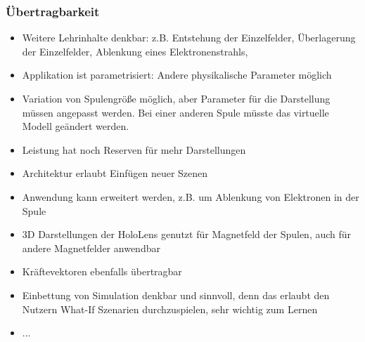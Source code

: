 \subsubsection{Übertragbarkeit}
\begin{itemize}
	\item Weitere Lehrinhalte denkbar: z.B. Entstehung der Einzelfelder, Überlagerung der Einzelfelder, Ablenkung eines Elektronenstrahls, 
	\item Applikation ist parametrisiert: Andere physikalische Parameter möglich
	\item Variation von Spulengröße möglich, aber Parameter für die Darstellung müssen angepasst werden. Bei einer anderen Spule müsste das virtuelle Modell geändert werden.
	\item Leistung hat noch Reserven für mehr Darstellungen
	\item Architektur erlaubt Einfügen neuer Szenen
\end{itemize}
\begin{itemize}
	\item Anwendung kann erweitert werden, z.B. um Ablenkung von Elektronen in der Spule
	\item 3D Darstellungen der HoloLens genutzt für Magnetfeld der Spulen, auch für andere Magnetfelder anwendbar
	\item Kräftevektoren ebenfalls übertragbar
	\item Einbettung von Simulation denkbar und sinnvoll, denn das erlaubt den Nutzern What-If Szenarien durchzuspielen, sehr wichtig zum Lernen
	\item ...
\end{itemize}
	
	
	
	
	
	
	
	
	
	
	
	
	
	
	